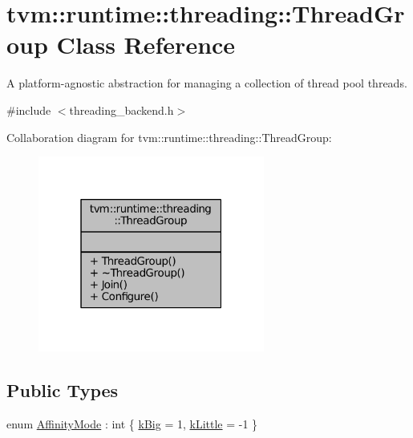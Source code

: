 \hypertarget{classtvm_1_1runtime_1_1threading_1_1ThreadGroup}{}\section{tvm\+:\+:runtime\+:\+:threading\+:\+:Thread\+Group Class Reference}
\label{classtvm_1_1runtime_1_1threading_1_1ThreadGroup}


A platform-\/agnostic abstraction for managing a collection of thread pool threads.  




{\ttfamily \#include $<$threading\+\_\+backend.\+h$>$}



Collaboration diagram for tvm\+:\+:runtime\+:\+:threading\+:\+:Thread\+Group\+:
\nopagebreak
\begin{figure}[H]
\begin{center}
\leavevmode
\includegraphics[width=211pt]{classtvm_1_1runtime_1_1threading_1_1ThreadGroup__coll__graph}
\end{center}
\end{figure}
\subsection*{Public Types}
\begin{DoxyCompactItemize}
\item 
enum \hyperlink{classtvm_1_1runtime_1_1threading_1_1ThreadGroup_a5230a4c2d7f6c2f73f3d5fb00e9f6acd}{Affinity\+Mode} \+: int \{ \hyperlink{classtvm_1_1runtime_1_1threading_1_1ThreadGroup_a5230a4c2d7f6c2f73f3d5fb00e9f6acda5dcdee58295aad729c0ef90cd4d807bf}{k\+Big} = 1, 
\hyperlink{classtvm_1_1runtime_1_1threading_1_1ThreadGroup_a5230a4c2d7f6c2f73f3d5fb00e9f6acda618cfa7040dff793381df4c9e6c13b73}{k\+Little} = -\/1
 \}
\end{DoxyCompactItemize}
